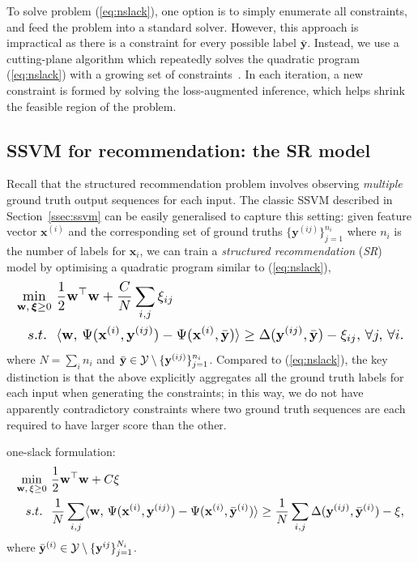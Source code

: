 To solve problem (\ref{eq:nslack}), one option is to simply enumerate all constraints, and feed the problem into a standard solver.
However, this approach is impractical as there is a constraint for every possible label $\bar{\mathbf{y}}$.
Instead, we use a cutting-plane algorithm which repeatedly solves the quadratic program (\ref{eq:nslack}) 
with a growing set of constraints~\cite{joachims2009predicting}.
In each iteration, a new constraint is formed by solving the loss-augmented inference, 
which helps shrink the feasible region of the problem.


\subsection{SSVM for recommendation: the SR model}
\label{ssec:sr}

Recall that the structured recommendation problem
involves observing \emph{multiple} ground truth output sequences for each input.
The classic SSVM described in Section~\ref{ssec:ssvm} can be easily generalised to capture this setting:
given feature vector $\mathbf{x}^{(i)}$ and the corresponding set of ground truths $\{\mathbf{y}^{(ij)}\}_{j=1}^{n_i}$
where $n_i$ is the number of labels for $\mathbf{x}_i$,
we can train a \emph{structured recommendation} (\emph{SR}) model by optimising a quadratic program similar to (\ref{eq:nslack}),
\begin{equation}
\label{eq:nslack_ml}
\resizebox{0.99\linewidth}{!}{$
\begin{aligned}
\min_{\mathbf{w}, \, \bm{\xi} \ge 0} ~& \frac{1}{2} \mathbf{w}^\top \mathbf{w} + \frac{C}{N} \sum_{i,j} \xi_{ij} \\
s.t.~ ~& \langle \mathbf{w}, \, \Psi(\mathbf{x}^{(i)}, \mathbf{y}^{(ij)}) - \Psi(\mathbf{x}^{(i)}, \bar{\mathbf{y}}) \rangle \ge 
         \Delta(\mathbf{y}^{(ij)}, \bar{\mathbf{y}}) - \xi_{ij}, \, \forall j, \, \forall i.
\end{aligned}
$}
\end{equation}
where $N = \sum_i n_i$ and $\bar{\mathbf{y}} \in \mathcal{Y} \setminus \{\mathbf{y}^{(ij)}\}_{j=1}^{n_i}$.
Compared to (\ref{eq:nslack}), the key distinction is that the above
explicitly aggregates all the ground truth labels for each input when generating the constraints;
in this way, we do not have apparently contradictory constraints where
two ground truth sequences are each required to have larger score than the other.

one-slack formulation:
\begin{equation}
\label{eq:1slack_ml}
\resizebox{0.99\linewidth}{!}{$
\begin{aligned}
\min_{\w, \, \xi \ge 0} ~& \frac{1}{2} \w^\top \w + C \xi \\
s.t.~ ~& \frac{1}{N} \sum_{i,j} \langle \w, \, \Psi(\x^{(i)}, \y^{(ij)}) - \Psi(\x^{(i)}, \bar{\y}^{(i)}) \rangle \ge 
         \frac{1}{N} \sum_{i,j} \Delta(\y^{(ij)}, \bar{\y}^{(i)}) - \xi, 
\end{aligned}
$}
\end{equation}
where $\bar{\mathbf{y}}^{(i)} \in \mathcal{Y} \setminus \{\mathbf{y}^{ij}\}_{j=1}^{N_i}$.

